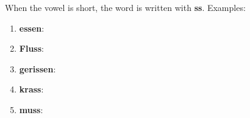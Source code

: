 When the vowel is short, the word is written with \textbf{ss}. Examples:

\begin{enumerate}
    \item \textbf{essen}: \textipa{["Es@n]}
    \item \textbf{Fluss}: \textipa{[flUs]}
    \item \textbf{gerissen}: \textipa{[g@"rIs@n]}
    \item \textbf{krass}: \textipa{[kras]}
    \item \textbf{muss}: \textipa{[mUs]}
\end{enumerate}
